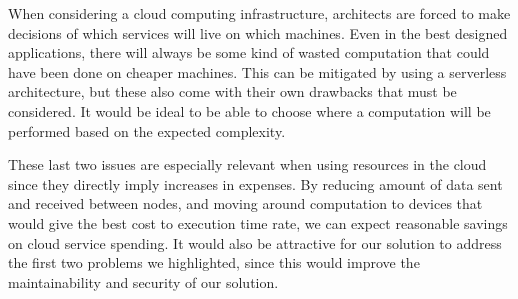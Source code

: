 When considering a cloud computing infrastructure, architects are forced to make decisions of which services will live on which machines. Even in the best designed applications, there will always be some kind of wasted computation that could have been done on cheaper machines. This can be mitigated by using a serverless architecture, but these also come with their own drawbacks that must be considered. It would be ideal to be able to choose where a computation will be performed based on the expected complexity.

These last two issues are especially relevant when using resources in the cloud since they directly imply increases in expenses. By reducing amount of data sent and received between nodes, and moving around computation to devices that would give the best cost to execution time rate, we can expect reasonable savings on cloud service spending. It would also be attractive for our solution to address the first two problems we highlighted, since this would improve the maintainability and security of our solution.


